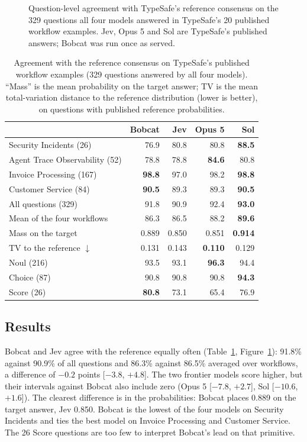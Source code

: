 \begin{figure}[t]
\centering
{}
\caption{Question-level agreement with TypeSafe's reference consensus on the 329 questions
all four models answered in TypeSafe's 20 published workflow examples. Jev, Opus 5 and Sol
are TypeSafe's published answers; Bobcat was run once as served.}
\label{fig:vsjev}
\end{figure}

\begin{table}[t]
\centering
\small
\caption{Agreement with the reference consensus on TypeSafe's published workflow examples
(329 questions answered by all four models). ``Mass'' is the mean probability on the target
answer; TV is the mean total-variation distance to the reference distribution (lower is
better), on questions with published reference probabilities.}
\label{tab:jev}
\begin{tabular}{@{}lrrrr@{}}
\toprule
 & Bobcat & Jev & Opus 5 & Sol \\
\midrule
Security Incidents (26) & 76.9 & 80.8 & 80.8 & \textbf{88.5} \\
Agent Trace Observability (52) & 78.8 & 78.8 & \textbf{84.6} & 80.8 \\
Invoice Processing (167) & \textbf{98.8} & 97.0 & 98.2 & \textbf{98.8} \\
Customer Service (84) & \textbf{90.5} & 89.3 & 89.3 & \textbf{90.5} \\
\midrule
All questions (329) & 91.8 & 90.9 & 92.4 & \textbf{93.0} \\
Mean of the four workflows & 86.3 & 86.5 & 88.2 & \textbf{89.6} \\
Mass on the target & 0.889 & 0.850 & 0.851 & \textbf{0.914} \\
TV to the reference $\downarrow$ & 0.131 & 0.143 & \textbf{0.110} & 0.129 \\
\midrule
Noul (216) & 93.5 & 93.1 & \textbf{96.3} & 94.4 \\
Choice (87) & 90.8 & 90.8 & 90.8 & \textbf{94.3} \\
Score (26) & \textbf{80.8} & 73.1 & 65.4 & 76.9 \\
\bottomrule
\end{tabular}
\end{table}

\subsection{Results}

Bobcat and Jev agree with the reference equally often (Table~\ref{tab:jev},
Figure~\ref{fig:vsjev}): 91.8\% against 90.9\% of all questions and 86.3\% against 86.5\%
averaged over workflows, a difference of $-0.2$ points [$-3.8$, $+4.8$]. The two frontier
models score higher, but their intervals against Bobcat also include zero (Opus 5 [$-7.8$,
$+2.7$], Sol [$-10.6$, $+1.6$]). The clearest difference is in the probabilities: Bobcat places
0.889 on the target answer, Jev 0.850. Bobcat is the lowest of the four models on Security
Incidents and ties the best model on Invoice Processing and Customer Service. The 26 Score
questions are too few to interpret Bobcat's lead on that primitive.

